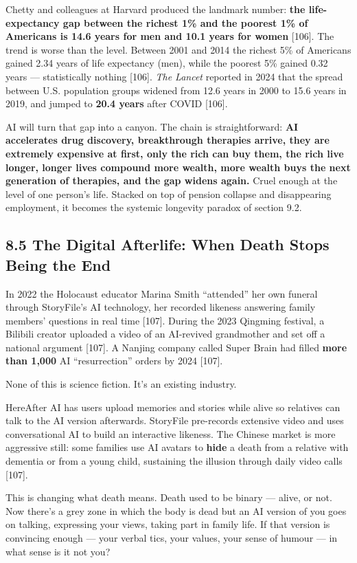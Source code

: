 \documentclass[11pt,a4paper]{article}
\begin{document}
Chetty and colleagues at Harvard produced the landmark number: \textbf{the life-expectancy gap between the richest 1\% and the poorest 1\% of Americans is 14.6 years for men and 10.1 years for women}{} [106]. The trend is worse than the level. Between 2001 and 2014 the richest 5\% of Americans gained 2.34 years of life expectancy (men), while the poorest 5\% gained 0.32 years --- statistically nothing [106]. \textit{The Lancet} reported in 2024 that the spread between U.S. population groups widened from 12.6 years in 2000 to 15.6 years in 2019, and jumped to \textbf{20.4 years} after COVID [106].

AI will turn that gap into a canyon. The chain is straightforward: \textbf{AI accelerates drug discovery, breakthrough therapies arrive, they are extremely expensive at first, only the rich can buy them, the rich live longer, longer lives compound more wealth, more wealth buys the next generation of therapies, and the gap widens again.} Cruel enough at the level of one person's life. Stacked on top of pension collapse and disappearing employment, it becomes the systemic longevity paradox of section 9.2.

\subsection{8.5 The Digital Afterlife: When Death Stops Being the End}

In 2022 the Holocaust educator Marina Smith ``attended'' her own funeral through StoryFile's AI technology, her recorded likeness answering family members' questions in real time [107]. During the 2023 Qingming festival, a Bilibili creator uploaded a video of an AI-revived grandmother and set off a national argument [107]. A Nanjing company called Super Brain had filled \textbf{more than 1,000} AI ``resurrection'' orders by 2024 [107].

None of this is science fiction. It's an existing industry.

HereAfter AI has users upload memories and stories while alive so relatives can talk to the AI version afterwards. StoryFile pre-records extensive video and uses conversational AI to build an interactive likeness. The Chinese market is more aggressive still: some families use AI avatars to \textbf{hide} a death from a relative with dementia or from a young child, sustaining the illusion through daily video calls [107].

This is changing what death means. Death used to be binary --- alive, or not. Now there's a grey zone in which the body is dead but an AI version of you goes on talking, expressing your views, taking part in family life. If that version is convincing enough --- your verbal tics, your values, your sense of humour --- in what sense is it not you?
\end{document}
